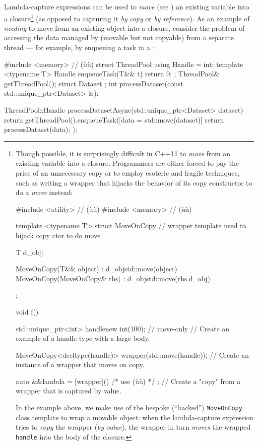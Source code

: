 Lambda-capture expressions can be used to \emph{move} (see
) an existing variable into a
closure{\cprotect\footnote{Though possible, it is surprisingly difficult
in C++11 to \emph{move} from an existing variable into a closure.
Programmers are either forced to pay the price of an unnecessary copy or to employ esoteric and fragile techniques, such as writing a wrapper
that hijacks the behavior of its copy constructor to do a \emph{move}
instead:

\begin{emcppslisting}[style=footcode]
#include <utility>  // (ù{}ù)
#include <memory>   // (ù{}ù)

template <typename T>
struct MoveOnCopy  // wrapper template used to hijack copy ctor to do move
{
    T d_obj;

    MoveOnCopy(T&& object) : d_obj{std::move(object)} { }
    MoveOnCopy(MoveOnCopy& rhs) : d_obj{std::move(rhs.d_obj)} { }
};

void f()
{
    std::unique_ptr<int> handle{new int(100)};  // move-only
        // Create an example of a handle type with a large body.

    MoveOnCopy<decltype(handle)> wrapper(std::move(handle));
        // Create an instance of a wrapper that moves on copy.

    auto &&lambda = [wrapper](){ /* use (ù{}ù) */ };
        // Create a "copy" from a wrapper that is captured by value.
}
\end{emcppslisting}

\noindent In the example above, we make use of the bespoke (``hacked'')
\lstinline!MoveOnCopy! class template to wrap a movable object;
when the lambda-capture expression tries to \emph{copy} the wrapper (\emph{by value}),
the wrapper in turn \emph{moves} the wrapped
  \lstinline!handle! into the body of the closure.}} (as opposed to
capturing it \emph{by copy} or \emph{by reference}). As an example of
\emph{needing} to move from an existing object into a closure, consider
the problem of accessing the data managed by
 (movable but not copyable) from a
separate thread --- for example, by enqueuing a task in a :

\begin{emcppshiddenlisting}[emcppsbatch=e1,emcppsstandards={c++14}]
#include <memory>   // (ù{}ù)
struct ThreadPool {
  using Handle = int;
  template <typename T>
  Handle enqueueTask(T&& t) { return 0; }
};
ThreadPool& getThreadPool();
struct Dataset {};
int processDataset(const std::unique_ptr<Dataset> &);
\end{emcppshiddenlisting}
\begin{emcppslisting}[emcppsbatch=e1]
ThreadPool::Handle processDatasetAsync(std::unique_ptr<Dataset> dataset)
{
    return getThreadPool().enqueueTask([data = std::move(dataset)]
    {
        return processDataset(data);
    });
}
\end{emcppslisting}

